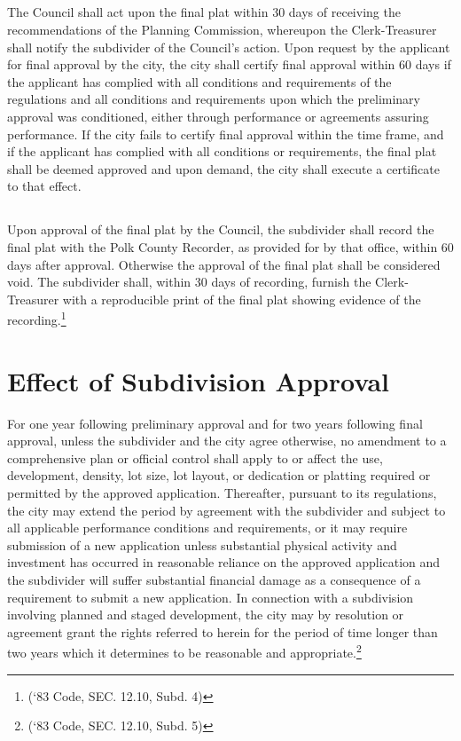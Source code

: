 \subsection{}
The Council shall act upon the final plat within 30 days of receiving the recommendations of the Planning Commission, whereupon the Clerk-Treasurer shall notify the subdivider of the Council’s action. Upon request by the applicant for final approval by the city, the city shall certify final approval within 60 days if the applicant has complied with all conditions and requirements of the regulations and all conditions and requirements upon which the preliminary approval was conditioned, either through performance or agreements assuring performance. If the city fails to certify final approval within the time frame, and if the applicant has complied with all conditions or requirements, the final plat shall be deemed approved and upon demand, the city shall execute a certificate to that effect.
\subsection{}
Upon approval of the final plat by the Council, the subdivider shall record the final plat with the Polk County Recorder, as provided for by that office, within 60 days after approval.  Otherwise the approval of the final plat shall be considered void. The subdivider shall, within 30 days of recording, furnish the Clerk-Treasurer with a reproducible print of the final plat showing evidence of the recording.\footnote{(‘83 Code, SEC. 12.10, Subd. 4)}
\section{Effect of Subdivision Approval}
For one year following preliminary approval and for two years following final approval, unless the subdivider and the city agree otherwise, no amendment to a comprehensive plan or official control shall apply to or affect the use, development, density, lot size, lot layout, or dedication or platting required or permitted by the approved application. Thereafter, pursuant to its regulations, the city may extend the period by agreement with the subdivider and subject to all applicable performance conditions and requirements, or it may require submission of a new application unless substantial physical activity and investment has occurred in reasonable reliance on the approved application and the subdivider will suffer substantial financial damage as a consequence of a requirement to submit a new application. In connection with a subdivision involving planned and staged development, the city may by resolution or agreement grant the rights referred to herein for the period of time longer than two years which it determines to be reasonable and appropriate.\footnote{(‘83 Code, SEC. 12.10, Subd. 5)}
